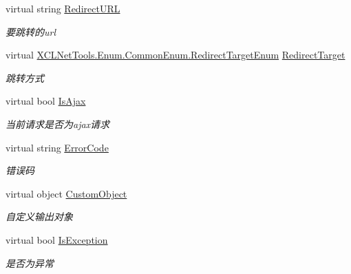 \begin{DoxyCompactItemize}
virtual string \hyperlink{class_x_c_l_net_tools_1_1_message_1_1_message_model_a571c6e0204605733f900eb3f906e038d}{Redirect\+U\+RL}
\begin{DoxyCompactList}\small\item\em 要跳转的url \end{DoxyCompactList}\item 
virtual \hyperlink{class_x_c_l_net_tools_1_1_enum_1_1_common_enum_a1cd31513e5ecf78c77d76be7954ae2f4}{X\+C\+L\+Net\+Tools.\+Enum.\+Common\+Enum.\+Redirect\+Target\+Enum} \hyperlink{class_x_c_l_net_tools_1_1_message_1_1_message_model_a318553f7c9db2b2c685e4944feb2901e}{Redirect\+Target}
\begin{DoxyCompactList}\small\item\em 跳转方式 \end{DoxyCompactList}\item 
virtual bool \hyperlink{class_x_c_l_net_tools_1_1_message_1_1_message_model_a1ea24cc20f05516f6266af92cc06479a}{Is\+Ajax}
\begin{DoxyCompactList}\small\item\em 当前请求是否为ajax请求 \end{DoxyCompactList}\item 
virtual string \hyperlink{class_x_c_l_net_tools_1_1_message_1_1_message_model_ab169d7bab20868e935d775459b72e625}{Error\+Code}
\begin{DoxyCompactList}\small\item\em 错误码 \end{DoxyCompactList}\item 
virtual object \hyperlink{class_x_c_l_net_tools_1_1_message_1_1_message_model_a8065226d89965a09b9ff8e69ba9974ca}{Custom\+Object}
\begin{DoxyCompactList}\small\item\em 自定义输出对象 \end{DoxyCompactList}\item 
virtual bool \hyperlink{class_x_c_l_net_tools_1_1_message_1_1_message_model_a2978a2953053a69008890758e419a1b3}{Is\+Exception}
\begin{DoxyCompactList}\small\item\em 是否为异常 \end{DoxyCompactList}\end{DoxyCompactItemize}


